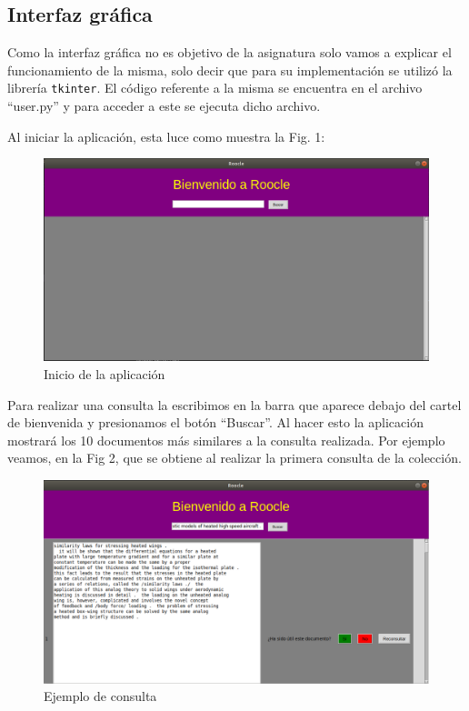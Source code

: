\documentclass[runningheads]{llncs}
\begin{document}
	\subsection{Interfaz gr\'afica}
	
	Como la interfaz gr\'afica no es objetivo de la asignatura solo vamos a explicar el funcionamiento de la misma, solo decir que para su implementaci\'on se utiliz\'o la librer\'ia \verb|tkinter|. El c\'odigo referente a la misma se encuentra en el archivo ``user.py'' y para acceder a este se ejecuta dicho archivo.
	
	Al iniciar la aplicaci\'on, esta luce como muestra la Fig. 1:
	
	\begin{figure}[h]
		\begin{center}
			\includegraphics[width =12.0cm]{inicio.png}
			\caption[Fig1]{Inicio de la aplicaci\'on}		
		\end{center}
	\end{figure}
	
	Para realizar una consulta la escribimos en la barra que aparece debajo del cartel de bienvenida y presionamos el bot\'on ``Buscar''. Al hacer esto la aplicaci\'on mostrar\'a los 10 documentos m\'as similares a la consulta realizada. Por ejemplo veamos, en la Fig 2, que se obtiene al realizar la primera consulta de la colecci\'on.
	
	\begin{figure}[h]
		\begin{center}
			\includegraphics[width =12.0cm]{consulta.png}	
			\caption[Fig2]{Ejemplo de consulta}	
		\end{center}
	\end{figure}
	
\end{document}
